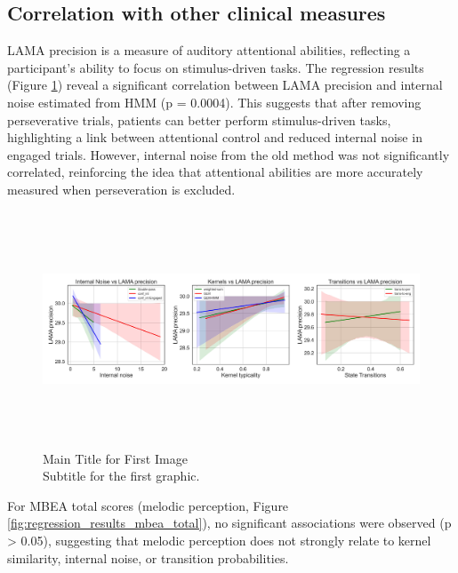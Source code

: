 \subsection {Correlation with other clinical measures} 
LAMA precision is a measure of auditory attentional abilities, reflecting a participant’s ability to focus on stimulus-driven tasks. The regression results (Figure \ref{fig:regression_results_lama_prec}) reveal a significant correlation between LAMA precision and internal noise estimated from HMM (p = 0.0004). This suggests that after removing perseverative trials, patients can better perform stimulus-driven tasks, highlighting a link between attentional control and reduced internal noise in engaged trials. However, internal noise from the old method was not significantly correlated, reinforcing the idea that attentional abilities are more accurately measured when perseveration is excluded.
\begin{figure}[H]
    \centering
    \includegraphics[width=17cm,height=7cm]{MainLayout/Images/chapter8/regression_results_lama_prec.jpg}
    \caption{Main Title for First Image \\ \small Subtitle for the first graphic.}
    \label{fig:regression_results_lama_prec}
\end{figure}
For MBEA total scores (melodic perception, Figure \ref{fig:regression_results_mbea_total}), no significant associations were observed (p > 0.05), suggesting that melodic perception does not strongly relate to kernel similarity, internal noise, or transition probabilities.


